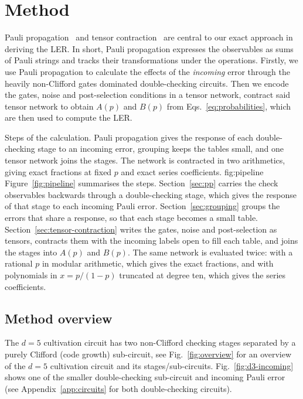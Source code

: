 \section{Method}\label{sec:method}
Pauli propagation~\cite{ppframework} and tensor contraction~\cite{itensor} are central to our exact approach in deriving the LER. 
In short, Pauli propagation expresses the observables as sums of Pauli strings and tracks
their transformations under the operations. 
Firstly, we use Pauli propagation to calculate the effects of the \textit{incoming} error through the heavily non-Clifford gates dominated double-checking circuits. 
Then we encode the gates, noise and post-selection conditions in a tensor network, contract said tensor network to obtain $A(p)$ and $B(p)$ from Eqs.~\eqref{eq:probabilities}, which are then used to compute the LER.

{Steps of the calculation. Pauli propagation gives the response of each double-checking stage to an incoming error, grouping keeps the tables small, and one tensor network joins the stages. The network is contracted in two arithmetics, giving exact fractions at fixed $p$ and exact series coefficients.}
{fig:pipeline}
Figure~\ref{fig:pipeline} summarises the steps. Section~\ref{sec:pp} carries the check observables backwards through a double-checking stage, which gives the response of that stage to each incoming Pauli error. Section~\ref{sec:grouping} groups the errors that share a response, so that each stage becomes a small table. Section~\ref{sec:tensor-contraction} writes the gates, noise and post-selection as tensors, contracts them with the incoming labels open to fill each table, and joins the stages into $A(p)$ and $B(p)$. The same network is evaluated twice: with a rational $p$ in modular arithmetic, which gives the exact fractions, and with polynomials in $x=p/(1-p)$ truncated at degree ten, which gives the series coefficients.

\subsection{Method overview}
The $d=5$ cultivation circuit has two non-Clifford checking stages separated by a purely Clifford (code growth) sub-circuit, see Fig.~\ref{fig:overview} for an overview of the $d=5$ cultivation circuit and its stages/sub-circuits. 
Fig.~\ref{fig:d3-incoming} shows one of the smaller double-checking sub-circuit and incoming Pauli error (see Appendix~\ref{app:circuits} for both double-checking circuits). 

